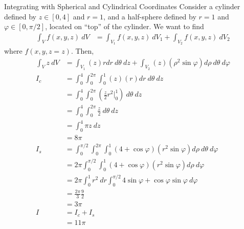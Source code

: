 \documentclass[8pt]{extarticle}
\begin{document}
  \begin{problem}{Integrating with Spherical and Cylindrical Coordinates}
    Consider a cylinder defined by $z\in [0,4]$ and $r = 1$, and a half-sphere defined by $r = 1$ and $\varphi\in [0,\pi/2]$, located on ``top'' of the cylinder. We want to find 
    \begin{align*}
      \int_{V}f(x,y,z)~dV &= \int_{V_1}f(x,y,z)~dV_1+ \int_{V_2}f(x,y,z)~dV_2
    \end{align*}
    where $f(x,y,z = z)$. Then,
    \begin{align*}
      \int_{V}z~dV &= \int_{V_1}(z)rdr~d\theta~dz + \int_{V_2}(z)(\rho^2\sin\varphi)d\rho~d\theta~d\varphi\\
      I_c &= \int_{0}^{4}\int_{0}^{2\pi}\int_{0}^{1}(z)(r)dr~d\theta~dz\\
          &= \int_{0}^{4}\int_{0}^{2\pi}\left(\frac{z}{2}r^2\biggr\vert_{0}^{1}\right)~d\theta~dz\\
          &= \int_{0}^{4}\int_{0}^{2\pi}\frac{z}{2}~d\theta~dz\\
          &= \int_{0}^{4} \pi z~dz\\
          &= 8\pi\\
      I_s &= \int_{0}^{\pi/2}\int_{0}^{2\pi}\int_{0}^{1} (4+\cos\varphi)(r^2\sin\varphi)d\rho~d\theta~d\varphi\\
          &= 2\pi\int_{0}^{\pi/2}\int_{0}^{1}(4 + \cos\varphi)(r^2\sin\varphi)d\rho~d\varphi\\
          &= 2\pi\int_{0}^{1}r^2~dr\int_{0}^{\pi/2}4\sin\varphi + \cos\varphi\sin\varphi~d\varphi\\
          &= \frac{2\pi}{3}\frac{9}{2}\\
          &= 3\pi\\
      I &= I_c + I_s\\
        &= 11\pi
    \end{align*}
  \end{problem}
\end{document}
